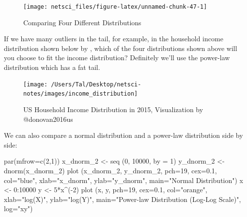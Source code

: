 \documentclass[
]{krantz}
\makeatletter
\newenvironment{Shaded}{\begin{snugshade}}{\end{snugshade}}
\newcommand{\AttributeTok}[1]{\textcolor[rgb]{0.61,0.61,0.61}{#1}}
\newcommand{\DecValTok}[1]{\textcolor[rgb]{0.06,0.06,0.06}{#1}}
\newcommand{\FloatTok}[1]{\textcolor[rgb]{0.06,0.06,0.06}{#1}}
\newcommand{\FunctionTok}[1]{\textcolor[rgb]{0,0,0}{#1}}
\newcommand{\NormalTok}[1]{#1}
\newcommand{\OtherTok}[1]{\textcolor[rgb]{0.37,0.37,0.37}{#1}}
\newcommand{\SpecialCharTok}[1]{\textcolor[rgb]{0,0,0}{#1}}
\newcommand{\StringTok}[1]{\textcolor[rgb]{0.5,0.5,0.5}{#1}}
\newenvironment{kframe}{%
\medskip{}
\setlength{\fboxsep}{.8em}
 \def\at@end@of@kframe{}%
 \ifinner\ifhmode%
  \def\at@end@of@kframe{\end{minipage}}%
  \begin{minipage}{\columnwidth}%
 \fi\fi%
 \def\FrameCommand##1{\hskip\@totalleftmargin \hskip-\fboxsep
 \colorbox{shadecolor}{##1}\hskip-\fboxsep
     \hskip-\linewidth \hskip-\@totalleftmargin \hskip\columnwidth}%
 \MakeFramed {\advance\hsize-\width
   \@totalleftmargin\z@ \linewidth\hsize
   \@setminipage}}%
 {\par\unskip\endMakeFramed%
 \at@end@of@kframe}
\renewenvironment{Shaded}{\begin{kframe}}{\end{kframe}}
\makeatother
\begin{document}
\begin{figure}

{\centering \texttt{[image: netsci\_files/figure-latex/unnamed-chunk-47-1]} 

}

\caption{Comparing Four Different Distributions}\label{fig:unnamed-chunk-47}
\end{figure}

If we have many outliers in the tail, for example, in the household income distribution shown below by \citet{donovan2016us}, which of the four distributions shown above will you choose to fit the income distribution? Definitely we'll use the power-law distribution which has a fat tail.

\begin{figure}

{\centering \texttt{[image: /Users/Tal/Desktop/netsci-notes/images/income\_distribution]} 

}

\caption{US Household Income Distribution in 2015, Visualization by @donovan2016us}\label{fig:unnamed-chunk-48}
\end{figure}

We can also compare a normal distribution and a power-law distribution side by side:

\begin{Shaded}
\begin{Highlighting}[]
\FunctionTok{par}\NormalTok{(}\AttributeTok{mfrow=}\FunctionTok{c}\NormalTok{(}\DecValTok{2}\NormalTok{,}\DecValTok{1}\NormalTok{))}
\NormalTok{x\_dnorm\_2 }\OtherTok{\textless{}{-}} \FunctionTok{seq}\NormalTok{ (}\DecValTok{0}\NormalTok{, }\DecValTok{10000}\NormalTok{, }\AttributeTok{by =} \DecValTok{1}\NormalTok{)}
\NormalTok{y\_dnorm\_2 }\OtherTok{\textless{}{-}}\FunctionTok{dnorm}\NormalTok{(x\_dnorm\_2)}
\FunctionTok{plot}\NormalTok{ (x\_dnorm\_2, y\_dnorm\_2, }\AttributeTok{pch=}\DecValTok{19}\NormalTok{, }\AttributeTok{cex=}\FloatTok{0.1}\NormalTok{, }\AttributeTok{col=}\StringTok{"blue"}\NormalTok{,}
      \AttributeTok{xlab=}\StringTok{"x\_dnorm"}\NormalTok{, }\AttributeTok{ylab=}\StringTok{"y\_dnorm"}\NormalTok{,}
      \AttributeTok{main=}\StringTok{"Normal Distribution"}\NormalTok{)}
\NormalTok{x }\OtherTok{\textless{}{-}} \DecValTok{0}\SpecialCharTok{:}\DecValTok{10000}
\NormalTok{y }\OtherTok{\textless{}{-}} \DecValTok{5}\SpecialCharTok{*}\NormalTok{x}\SpecialCharTok{\^{}}\NormalTok{(}\SpecialCharTok{{-}}\DecValTok{2}\NormalTok{)}
\FunctionTok{plot}\NormalTok{ (x, y, }\AttributeTok{pch=}\DecValTok{19}\NormalTok{, }\AttributeTok{cex=}\FloatTok{0.1}\NormalTok{, }\AttributeTok{col=}\StringTok{"orange"}\NormalTok{,}
      \AttributeTok{xlab=}\StringTok{"log(X)"}\NormalTok{, }\AttributeTok{ylab=}\StringTok{"log(Y)"}\NormalTok{,}
      \AttributeTok{main=}\StringTok{"Power{-}law Distribution (Log{-}Log Scale)"}\NormalTok{,}
      \AttributeTok{log=}\StringTok{"xy"}\NormalTok{)}
\end{Highlighting}
\end{Shaded}
\end{document}
